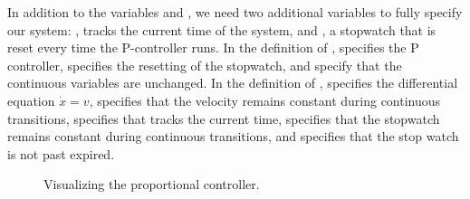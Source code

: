 \documentclass[preprint,nocopyrightspace]{sigplanconf}
\begin{document}
In addition to the variables  and , we need two additional variables to fully specify our system: , tracks the current time of the system, and , a stopwatch that is reset every time the P-controller runs.
In the definition of ,  specifies the P controller,  specifies the resetting of the stopwatch, and  specify that the continuous variables are unchanged.
In the definition of ,  specifies the differential equation $\dot{x} = v$,  specifies that the velocity remains constant during continuous transitions,  specifies that  tracks the current time,  specifies that the stopwatch remains constant during continuous transitions, and  specifies that the stop watch is not past expired.

\begin{figure}
\centering







\caption{Visualizing the proportional controller.}
\label{fig:system-visualization}
\end{figure}
\end{document}

